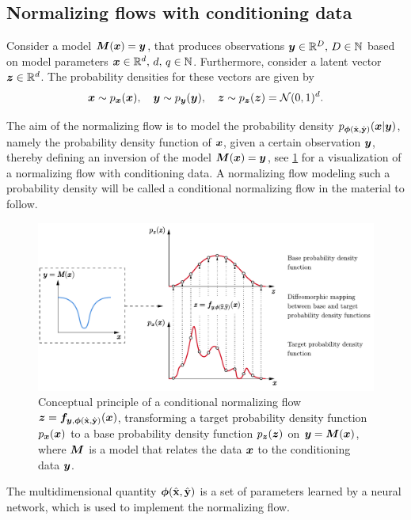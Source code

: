 \documentclass[a4paper,11pt]{report}
\def\fc#1{{\color{black}{#1}}} %
\begin{document}
\subsection{Normalizing flows with conditioning data}
Consider a model $\bm{M}(\bm{x}) = \bm{y}$, that produces observations $\bm{y} \in \mathbb{R}^D,\,D \in \mathbb{N}$ based on model parameters $\bm{x}\in\mathbb{R}^d,\,d,\,q \in \mathbb{N}$. Furthermore, consider a latent vector $\bm{z} \in \mathbb{R}^d$. The probability densities for these vectors are given by \begin{equation}
\bm{x} \sim p_{\bm{x}}(\bm{x}), \quad \bm{y} \sim p_{\bm{y}}(\bm{y}), \quad \bm{z}\sim p_{\bm{z}}(\bm{z}) = \mathcal{N}(0,1)^d.
\end{equation}

The aim of the normalizing flow is to model the probability density $p_{\bm{\phi}(\hat{\boldsymbol{\mathbf{x}}},\hat{\boldsymbol{\mathbf{y}}})}(\bm{x}|\bm{y})$, namely the probability density function of $\bm{x}$, given a certain observation $\bm{y}$, thereby defining an inversion of the model $\bm{M}(\bm{x}) = \bm{y}$, see \cref{fig:normflowconditional} for a visualization of a normalizing flow with conditioning data. A normalizing flow modeling such a probability density will be called a conditional normalizing flow in the material to follow.
\begin{figure}[h]
\centering
\includegraphics[width=\textwidth]{figures/normflowconditional.pdf}
\caption{Conceptual principle of a conditional normalizing flow $\bm{z} = \bm{f}_{\bm{y},\bm{\phi}(\hat{\boldsymbol{\mathbf{x}}},\hat{\boldsymbol{\mathbf{y}}})}(\bm{x})$, transforming a target probability density function $p_{\bm{x}}(\bm{x})$ to a base probability density function $p_{\bm{z}}(\bm{z})$ \fc{conditioned} on $\bm{y} = \bm{M}(\bm{x})$, where $\bm{M}$ is a model that relates the data $\bm{x}$ to the conditioning data $\bm{y}$.}
\label{fig:normflowconditional}
\end{figure}
The multidimensional quantity $\bm{\phi}(\hat{\boldsymbol{\mathbf{x}}},\hat{\boldsymbol{\mathbf{y}}})$ is a set of parameters learned by a neural network, which is used to implement the normalizing flow.
\end{document}
